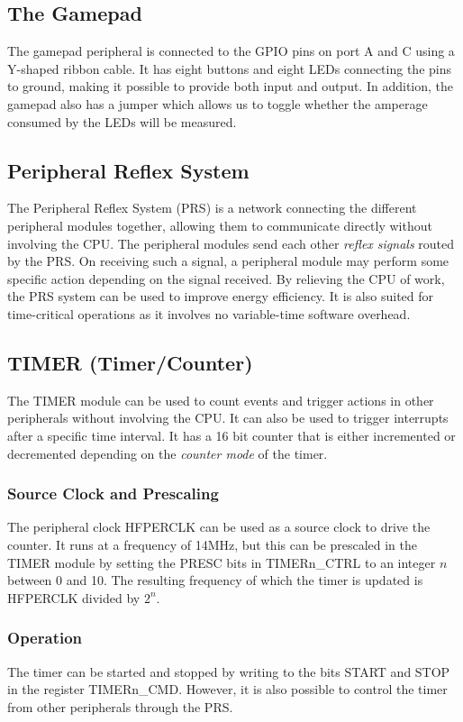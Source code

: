 \subsection{The Gamepad}
The gamepad peripheral is connected to the GPIO pins on port A and C using a Y-shaped ribbon cable. It has eight buttons and eight LEDs connecting the pins to ground, making it possible to provide both input and output. In addition, the gamepad also has a jumper which allows us to toggle whether the amperage consumed by the LEDs will be measured.


\subsection{Peripheral Reflex System}
The Peripheral Reflex System (PRS) is a network connecting the different peripheral modules together, allowing them to communicate directly without involving the CPU. The peripheral modules send each other \emph{reflex signals} routed by the PRS. On receiving such a signal, a peripheral module may perform some specific action depending on the signal received. By relieving the CPU of work, the PRS system can be used to improve energy efficiency. It is also suited for time-critical operations as it involves no variable-time software overhead.


\subsection{TIMER (Timer/Counter)}

The TIMER module can be used to count events and trigger actions in other peripherals without involving the CPU. It can also be used to trigger interrupts after a specific time interval. It has a 16 bit counter that is either incremented or decremented depending on the \emph{counter mode} of the timer.

\subsubsection{Source Clock and Prescaling} The peripheral clock HFPERCLK can be used as a source clock to drive the counter. It runs at a frequency of 14MHz, but this can be prescaled in the TIMER module by setting the PRESC bits in TIMERn\_CTRL to an integer $n$ between 0 and 10. The resulting frequency of which the timer is updated is HFPERCLK divided by $2^{n}$.

\subsubsection{Operation}
The timer can be started and stopped by writing to the bits START and STOP in the register TIMERn\_CMD. However, it is also possible to control the timer from other peripherals through the PRS.

